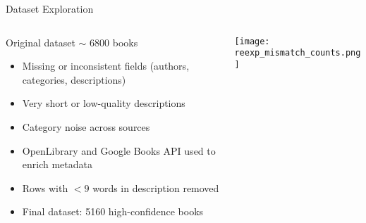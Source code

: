 \begin{frame}{Dataset Exploration}
  
\begin{columns}[T]
  \centering
  \begin{column}{0.49\textwidth}
    Original dataset $\sim$ 6800 books
    \begin{itemize}
          \item Missing or inconsistent fields (authors, categories, descriptions)
          \item Very short or low-quality descriptions
          \item Category noise across sources
          \item OpenLibrary and Google Books API used to enrich metadata
          \item Rows with $<9$ words in description removed
          \item Final dataset: 5160 high-confidence books
        \end{itemize}
  \end{column}

  \begin{column}{0.49\textwidth}
  \centering
      \texttt{[image: reexp\_mismatch\_counts.png]}
  \end{column}
\end{columns}
\end{frame}